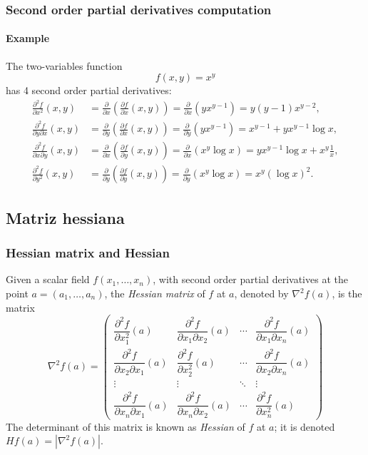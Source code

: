 \begin{frame}
\frametitle{Second order partial derivatives computation}
\framesubtitle{Example}
The two-variables function 
\[f(x,y)=x^y\]
has 4 second order partial derivatives:
\begin{align*}
\frac{\partial^2 f}{\partial x^2}(x,y) &=
\frac{\partial}{\partial x}\left(\frac{\partial f}{\partial x}(x,y)\right) =
\frac{\partial}{\partial x}\left(yx^{y-1}\right) =
y(y-1)x^{y-2},\\
\frac{\partial^2 f}{\partial y \partial x}(x,y) &=
\frac{\partial}{\partial y}\left(\frac{\partial f}{\partial x}(x,y)\right) =
\frac{\partial}{\partial y}\left(yx^{y-1}\right) =
x^{y-1}+yx^{y-1}\log x,\\
\frac{\partial^2 f}{\partial x \partial y}(x,y) &=
\frac{\partial}{\partial x}\left(\frac{\partial f}{\partial y}(x,y)\right) =
\frac{\partial}{\partial x}\left(x^y\log x \right) =
yx^{y-1}\log x+x^y\frac{1}{x},\\
\frac{\partial^2 f}{\partial y^2}(x,y) &=
\frac{\partial}{\partial y}\left(\frac{\partial f}{\partial y}(x,y)\right) =
\frac{\partial}{\partial y}\left(x^y\log x \right) =
x^y(\log x)^2.
\end{align*}
\end{frame}



\subsection{Matriz hessiana}
\begin{frame}
\frametitle{Hessian matrix and Hessian}
\begin{definition}
Given a scalar field $f(x_1,\ldots,x_n)$, with second order partial derivatives at the point $a=(a_1,\ldots,a_n)$, the \emph{Hessian matrix} of $f$ at $a$, denoted by $\nabla^2f(a)$, is the matrix 
\[
\nabla^2f(a)=\left(
\begin{array}{cccc}
\dfrac{\partial^2 f}{\partial x_1^2}(a) &
\dfrac{\partial^2 f}{\partial x_1 \partial x_2}(a) &
\cdots &
\dfrac{\partial^2 f}{\partial x_1 \partial x_n}(a)\\
\dfrac{\partial^2 f}{\partial x_2 \partial x_1}(a) &
\dfrac{\partial^2 f}{\partial x_2^2}(a) &
\cdots &
\dfrac{\partial^2 f}{\partial x_2 \partial x_n}(a)\\
\vdots & \vdots & \ddots & \vdots \\
\dfrac{\partial^2 f}{\partial x_n \partial x_1}(a) &
\dfrac{\partial^2 f}{\partial x_n \partial x_2}(a) &
\cdots &
\dfrac{\partial^2 f}{\partial x_n^2}(a)
\end{array}
\right)
\]
The determinant of this matrix is known as \emph{Hessian} of $f$ at $a$; it is denoted $Hf(a)=|\nabla^2f(a)|$.
\end{definition}
\end{frame}


